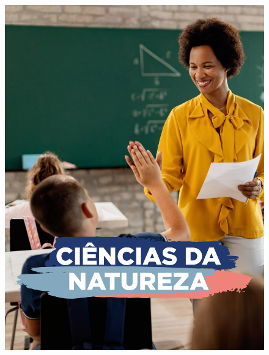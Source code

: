 \begin{figure}[htpb]
\vspace*{-2.5cm}
\hspace*{-2.5cm}\includegraphics[height=\paperheight]{../separadores/separadorCNT5A.png}
\end{figure}
\pagebreak

